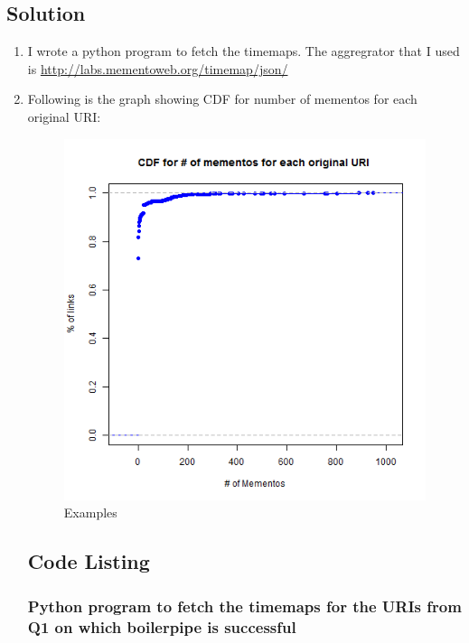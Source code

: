 \subsection{Solution}
\begin{enumerate}

\item I wrote a python program to fetch the timemaps. The aggregrator that I used is \url{http://labs.mementoweb.org/timemap/json/}
\item Following is the graph showing CDF for number of mementos for each original URI:

\begin{figure}[ht]    
    \begin{center}
        \includegraphics[scale=0.60]{graphs/2_mementoCount.png}
        \caption{Examples}        
    \end{center}
\end{figure}


\newpage
\subsection{Code Listing}
\subsubsection{Python program to fetch the timemaps for the URIs from Q1 on which boilerpipe is successful}

\newpage


\end{enumerate}
